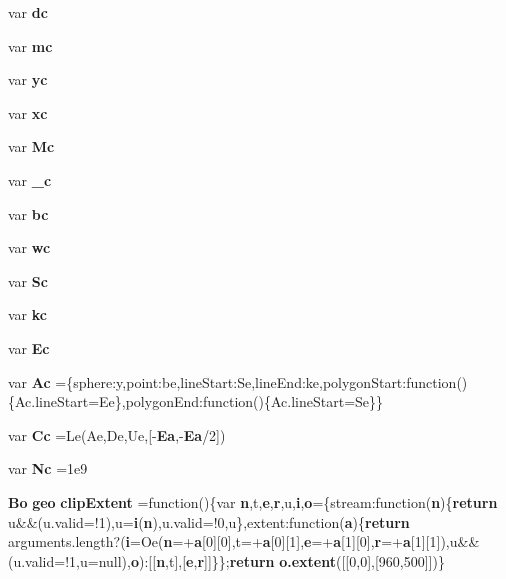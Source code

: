 \begin{DoxyCompactItemize}
\item 
var {\bf dc}
\item 
var {\bf mc}
\item 
var {\bf yc}
\item 
var {\bf xc}
\item 
var {\bf Mc}
\item 
var {\bf \+\_\+c}
\item 
var {\bf bc}
\item 
var {\bf wc}
\item 
var {\bf Sc}
\item 
var {\bf kc}
\item 
var {\bf Ec}
\item 
var {\bf Ac} =\{sphere\+:y,point\+:be,line\+Start\+:\+Se,line\+End\+:ke,polygon\+Start\+:function()\{Ac.\+line\+Start=Ee\},polygon\+End\+:function()\{Ac.\+line\+Start=Se\}\}
\item 
var {\bf Cc} =Le(Ae,De,Ue,[-\/{\bf Ea},-\/{\bf Ea}/2])
\item 
var {\bf Nc} =1e9
\item 
{\bf Bo} {\bf geo} {\bf clip\+Extent} =function()\{var {\bf n},t,{\bf e},{\bf r},u,{\bf i},{\bf o}=\{stream\+:function({\bf n})\{{\bf return} u\&\&(u.\+valid=!1),u={\bf i}({\bf n}),u.\+valid=!0,u\},extent\+:function({\bf a})\{{\bf return} arguments.\+length?({\bf i}=Oe({\bf n}=+{\bf a}[0][0],t=+{\bf a}[0][1],{\bf e}=+{\bf a}[1][0],{\bf r}=+{\bf a}[1][1]),u\&\&(u.\+valid=!1,u=null),{\bf o})\+:[[{\bf n},t],[{\bf e},{\bf r}]]\}\};{\bf return} {\bf o.\+extent}([[0,0],[960,500]])\}
\item 

\end{DoxyCompactItemize}
